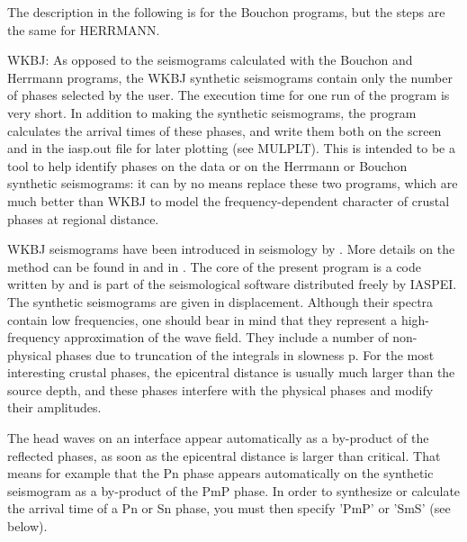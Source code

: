 The description in the following is for the Bouchon programs, but the steps are the same for 
HERRMANN. 

WKBJ:\newline
{}
As opposed to the seismograms calculated with the Bouchon and Herrmann programs, the WKBJ synthetic seismograms contain only the number of phases selected by the user. The execution time for one run of the program is very short. In addition to making the synthetic seismograms, the program calculates the arrival times of these phases, and write them both on the screen and in the iasp.out file for later plotting (see MULPLT). This is intended to be a tool to help identify phases on the data or on the Herrmann or Bouchon synthetic seismograms: it can by no means replace these two programs, which are much better than WKBJ to model the frequency-dependent character of crustal phases at regional distance. 

WKBJ seismograms have been introduced in seismology by \citet{chapman1978}. More details on the method can be found in \citet{deysarkar1978} and in \citet{chapman1985}. The core of the present program is a code written by \citet{chapman1988} and is part of the seismological software distributed freely by IASPEI. 
The synthetic seismograms are given in displacement. Although their spectra contain low frequencies, one should bear in mind that they represent a high-frequency approximation of the wave field. They include a number of non-physical phases due to truncation of the integrals in slowness p. For the most interesting crustal phases, the epicentral distance is usually much larger than the source depth, and these phases interfere with the physical phases and modify their amplitudes. 

The head waves on an interface appear automatically as a by-product of the reflected phases, as soon as the epicentral distance is larger than critical. That means for example that the Pn phase appears automatically on the synthetic seismogram as a by-product of the PmP phase. In order to synthesize or calculate the arrival time of a Pn or Sn phase, you must then specify 'PmP' or 'SmS' (see below). 

